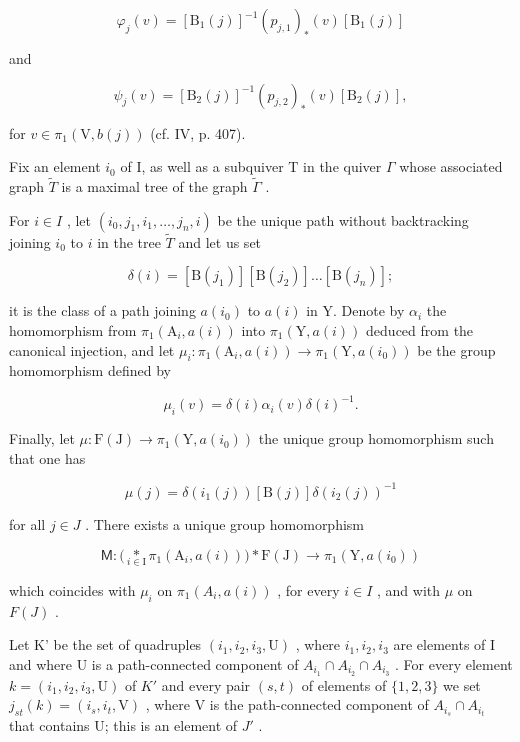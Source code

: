 \[
\varphi_ {j} (v) = [ \mathrm{B} _ {1} (j) ] ^ {- 1} (p _ {j, 1}) _ {*} (v) [ \mathrm{B} _ {1} (j) ]
\]

and

\[
\psi_ {j} (v) = [ \mathrm{B} _ {2} (j) ] ^ {- 1} (p _ {j, 2}) _ {*} (v) [ \mathrm{B} _ {2} (j) ],
\]

for \(v \in \pi_1(\mathrm{V}, b(j))\) (cf. IV, p. 407).

Fix an element \(i_0\) of I, as well as a subquiver T in the quiver \(\Gamma\) whose associated graph \(\widetilde{T}\) is a maximal tree of the graph \(\widetilde{\Gamma}\) .

For \(i \in I\) , let \((i_0, j_1, i_1, \ldots, j_n, i)\) be the unique path without backtracking joining \(i_0\) to \(i\) in the tree \(\widetilde{T}\) and let us set

\[
\delta (i) = \left[ \mathrm{B} \left(j _ {1}\right) \right] \left[ \mathrm{B} \left(j _ {2}\right) \right] \dots \left[ \mathrm{B} \left(j _ {n}\right) \right];
\]

it is the class of a path joining \(a(i_0)\) to \(a(i)\) in Y. Denote by \(\alpha_i\) the homomorphism from \(\pi_1(\mathrm{A}_i, a(i))\) into \(\pi_1(\mathrm{Y}, a(i))\) deduced from the canonical injection, and let \(\mu_i: \pi_1(\mathrm{A}_i, a(i)) \to \pi_1(\mathrm{Y}, a(i_0))\) be the group homomorphism defined by

\[
\mu_ {i} (v) = \delta (i) \alpha_ {i} (v) \delta (i) ^ {- 1}.
\]

Finally, let \(\mu\colon\mathrm{F}(\mathrm{J})\to\pi_{1}(\mathrm{Y},a(i_{0}))\) the unique group homomorphism such that one has

\[
\mu (j) = \delta (i _ {1} (j)) [ \mathrm{B} (j) ] \delta (i _ {2} (j)) ^ {- 1}
\]

for all \(j \in J\) . There exists a unique group homomorphism

\[
\mathsf {M} \colon \big (\underset {i \in \mathrm{I}} {\ast} \pi_ {1} (\mathrm{A} _ {i}, a (i)) \big) \ast \mathrm{F} (\mathrm{J}) \to \pi_ {1} (\mathrm{Y}, a (i _ {0}))
\]

which coincides with \(\mu_i\) on \(\pi_1(A_i, a(i))\) , for every \(i \in I\) , and with \(\mu\) on \(F(J)\) .

Let K' be the set of quadruples \((i_{1}, i_{2}, i_{3}, \mathrm{U})\) , where \(i_{1}, i_{2}, i_{3}\) are elements of I and where U is a path-connected component of \(A_{i_{1}} \cap A_{i_{2}} \cap A_{i_{3}}\) . For every element \(k = (i_{1}, i_{2}, i_{3}, \mathrm{U})\) of \(K'\) and every pair \((s, t)\) of elements of \(\{1, 2, 3\}\) we set \(j_{st}(k) = (i_{s}, i_{t}, \mathrm{V})\) , where V is the path-connected component of \(A_{i_{s}} \cap A_{i_{t}}\) that contains U; this is an element of \(J'\) .

